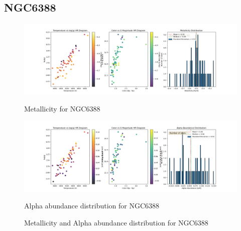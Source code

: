 \documentclass[a4paper,12pt]{article}
\begin{document}
\subsection{NGC6388}
\begin{figure}[H]
    \centering
    \begin{minipage}[b]{0.8\textwidth}
        \centering
        \includegraphics[width=\textwidth]{NGC6388_metalicity.png}
        \caption{Metallicity for NGC6388}
        \label{fig:NGC6388_metalicity}
    \end{minipage}
    \hfill
    \begin{minipage}[b]{0.8\textwidth}
        \centering
        \includegraphics[width=\textwidth]{NGC6388_alpha.png}
        \caption{Alpha abundance distribution for NGC6388}
        \label{fig:NGC6388_alpha}
    \end{minipage}
    \caption{Metallicity and Alpha abundance distribution for NGC6388}
    \label{fig:NGC6388_combined}
\end{figure}
\clearpage
\end{document}
